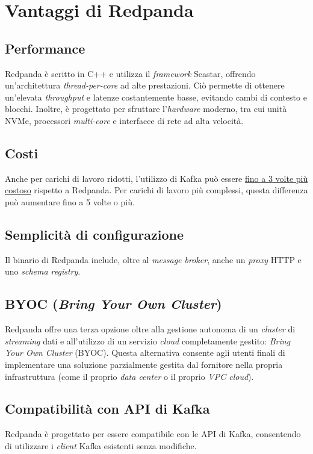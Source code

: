 \section{Vantaggi di Redpanda}
\subsection{Performance}
Redpanda è scritto in C++ e utilizza il \textit{framework} Seastar, offrendo un'architettura \textit{thread-per-core} ad alte prestazioni.
Ciò permette di ottenere un'elevata \textit{throughput} e latenze costantemente basse, evitando cambi di contesto e blocchi.
Inoltre, è progettato per sfruttare l'\textit{hardware} moderno, tra cui unità NVMe, processori \textit{multi-core} e interfacce di rete ad alta velocità.

\subsection{Costi}
Anche per carichi di lavoro ridotti, l'utilizzo di Kafka può essere \href{https://redpanda.com/blog/is-redpanda-better-than-kafka-tco-comparison}{fino a 3 volte più costoso} rispetto a Redpanda. Per carichi di lavoro più complessi, questa differenza può aumentare fino a 5 volte o più.

\subsection{Semplicità di configurazione}
Il binario di Redpanda include, oltre al \textit{message broker}, anche
un \textit{proxy} HTTP e uno \textit{schema registry}.

\subsection{BYOC (\textit{Bring Your Own Cluster})}
Redpanda offre una terza opzione oltre alla gestione autonoma di un \textit{cluster} di \textit{streaming}
dati e all'utilizzo di un servizio \textit{cloud} completamente gestito: \textit{Bring Your Own Cluster} (BYOC).
Questa alternativa consente agli utenti finali di implementare una soluzione parzialmente gestita dal fornitore nella propria infrastruttura (come il proprio \textit{data center}
o il proprio \textit{VPC cloud}).

\subsection{Compatibilità con API di Kafka}
Redpanda è progettato per essere compatibile con le API di Kafka, consentendo di utilizzare i \textit{client} Kafka esistenti senza modifiche.

